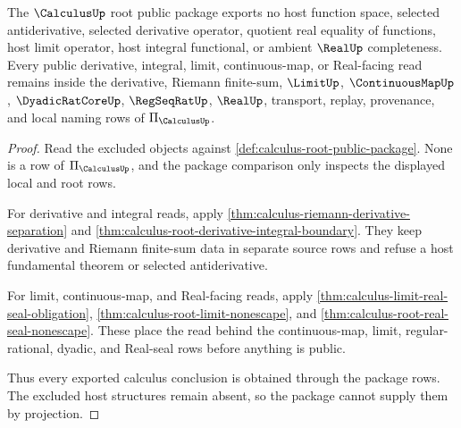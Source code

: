 \begin{theorem}
\label{thm:calculus-root-package-nonescape}
The $\CalculusUp$ root public package exports no host function space, selected antiderivative, selected derivative operator, quotient real equality of functions, host limit operator, host integral functional, or ambient $\RealUp$ completeness. Every public derivative, integral, limit, continuous-map, or Real-facing read remains inside the derivative, Riemann finite-sum, $\LimitUp$, $\ContinuousMapUp$, $\DyadicRatCoreUp$, $\RegSeqRatUp$, $\RealUp$, transport, replay, provenance, and local naming rows of $\Pi_{\CalculusUp}$.
\end{theorem}
\begin{proof}
Read the excluded objects against \autoref{def:calculus-root-public-package}. None is a row of $\Pi_{\CalculusUp}$, and the package comparison only inspects the displayed local and root rows.

For derivative and integral reads, apply \autoref{thm:calculus-riemann-derivative-separation} and \autoref{thm:calculus-root-derivative-integral-boundary}. They keep derivative and Riemann finite-sum data in separate source rows and refuse a host fundamental theorem or selected antiderivative.

For limit, continuous-map, and Real-facing reads, apply \autoref{thm:calculus-limit-real-seal-obligation}, \autoref{thm:calculus-root-limit-nonescape}, and \autoref{thm:calculus-root-real-seal-nonescape}. These place the read behind the continuous-map, limit, regular-rational, dyadic, and Real-seal rows before anything is public.

Thus every exported calculus conclusion is obtained through the package rows. The excluded host structures remain absent, so the package cannot supply them by projection.
\end{proof}

